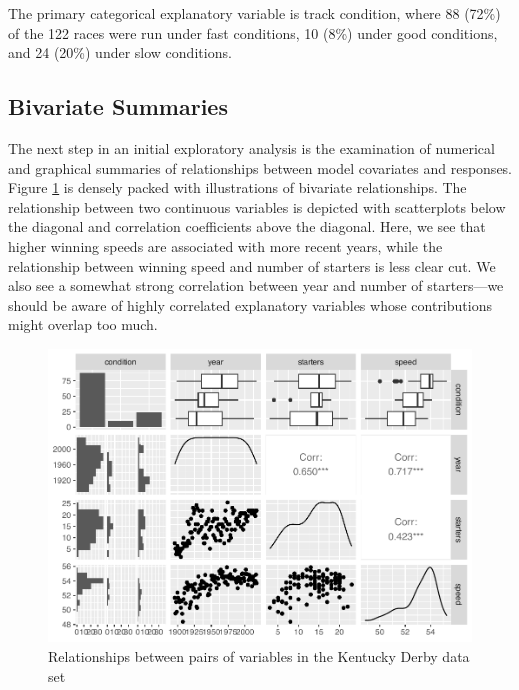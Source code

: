 \documentclass[
]{krantz}
\begin{document}
The primary categorical explanatory variable is track condition, where 88 (72\%) of the 122 races were run under fast conditions, 10 (8\%) under good conditions, and 24 (20\%) under slow conditions.

\hypertarget{bivariate-summaries}{%
\subsection{Bivariate Summaries}\label{bivariate-summaries}}

The next step in an initial exploratory analysis is the examination of numerical and graphical summaries of relationships between model covariates and responses. Figure \ref{fig:bivariate} is densely packed with illustrations of bivariate relationships. The relationship between two continuous variables is depicted with scatterplots below the diagonal and correlation coefficients above the diagonal. Here, we see that higher winning speeds are associated with more recent years, while the relationship between winning speed and number of starters is less clear cut. We also see a somewhat strong correlation between year and number of starters---we should be aware of highly correlated explanatory variables whose contributions might overlap too much.

\begin{figure}

{\centering \includegraphics[width=0.9\linewidth]{bookdown-BeyondMLR_files/figure-latex/bivariate-1} 

}

\caption{Relationships between pairs of variables in the Kentucky Derby data set}\label{fig:bivariate}
\end{figure}
\end{document}
